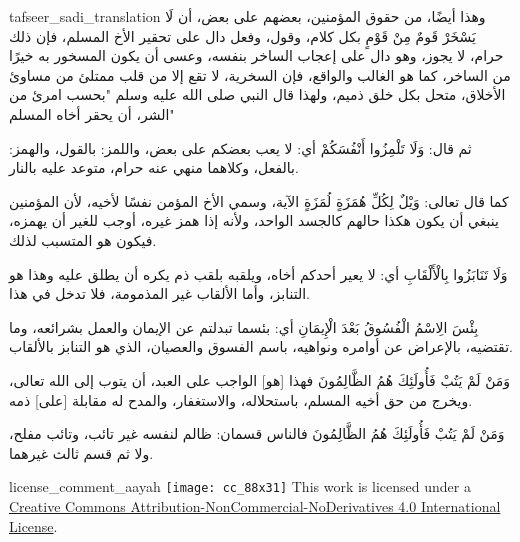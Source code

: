 \begin{taggedblock}{tafseer_sadi_translation}
وهذا أيضًا، من حقوق المؤمنين، بعضهم على بعض، أن
{ لَا يَسْخَرْ قَومٌ مِنْ قَوْمٍ }
بكل كلام، وقول، وفعل دال على تحقير الأخ المسلم، فإن ذلك حرام، لا يجوز، وهو دال على إعجاب الساخر بنفسه، وعسى أن يكون المسخور به خيرًا من الساخر، كما هو  الغالب والواقع، فإن السخرية، لا تقع إلا من قلب ممتلئ من مساوئ الأخلاق، متحل بكل خلق ذميم، ولهذا قال النبي صلى الله عليه وسلم
"بحسب امرئ من الشر، أن يحقر أخاه المسلم"

ثم قال:
{ وَلَا تَلْمِزُوا أَنْفُسَكُمْ }
أي: لا يعب بعضكم على بعض، واللمز: بالقول، والهمز: بالفعل، وكلاهما منهي عنه حرام، متوعد عليه بالنار.

كما قال تعالى:
{ وَيْلٌ لِكُلِّ هُمَزَةٍ لُمَزَةٍ }
الآية، وسمي الأخ المؤمن  نفسًا لأخيه، لأن المؤمنين ينبغي أن يكون هكذا حالهم كالجسد الواحد، ولأنه إذا همز غيره، أوجب للغير أن يهمزه، فيكون هو المتسبب لذلك.

{ وَلَا تَنَابَزُوا بِالْأَلْقَابِ }
أي: لا يعير أحدكم أخاه، ويلقبه بلقب ذم يكره أن يطلق عليه  وهذا هو التنابز، وأما الألقاب غير المذمومة، فلا تدخل في هذا.

{ بِئْسَ الِاسْمُ الْفُسُوقُ بَعْدَ الْإِيمَانِ }
أي: بئسما تبدلتم عن الإيمان والعمل بشرائعه، وما تقتضيه، بالإعراض عن أوامره ونواهيه، باسم الفسوق والعصيان، الذي هو التنابز بالألقاب.

{ وَمَنْ لَمْ يَتُبْ فَأُولَئِكَ هُمُ الظَّالِمُونَ }
فهذا
[هو]
الواجب على العبد، أن يتوب إلى الله تعالى، ويخرج من حق أخيه المسلم، باستحلاله، والاستغفار، والمدح له مقابلة
[على]
ذمه.

{ وَمَنْ لَمْ يَتُبْ فَأُولَئِكَ هُمُ الظَّالِمُونَ }
فالناس قسمان: ظالم لنفسه غير تائب، وتائب مفلح، ولا ثم قسم ثالث غيرهما.
\end{taggedblock}
\begin{taggedblock}{license_comment_aayah}
\texttt{[image: cc\_88x31]}
This work is licensed under a 
\href{http://creativecommons.org/licenses/by-nc-nd/4.0/}{Creative Commons Attribution-NonCommercial-NoDerivatives 4.0 International License}.
\end{taggedblock}
\begin{comment}
Please use the following for footnotes:- Sample\footnoteQ{Text of Qur'an footnote goes here.}.
Sample\footnoteT{Text of Tafseer footnote goes here.}.
\end{comment}